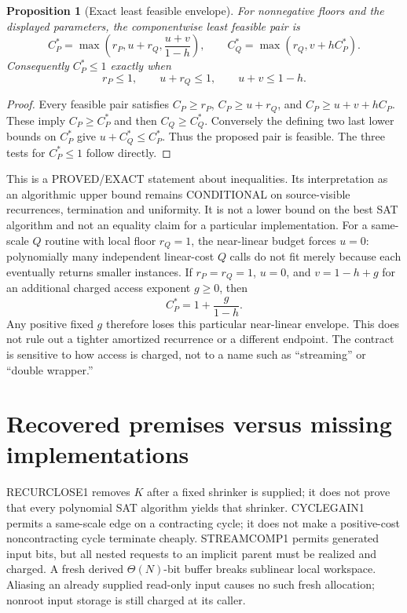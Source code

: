\documentclass[11pt]{article}
\newtheorem{proposition}{Proposition}
\begin{document}
\begin{proposition}[Exact least feasible envelope]
For nonnegative floors and the displayed parameters, the componentwise
least feasible pair is
\[
 C_P^*=\max\left(r_P,u+r_Q,\frac{u+v}{1-h}\right),\qquad
 C_Q^*=\max(r_Q,v+hC_P^*).
\]
Consequently $C_P^*\le1$ exactly when
\[
 \boxed{r_P\le1,\qquad u+r_Q\le1,\qquad u+v\le1-h.}
\]
\end{proposition}
\begin{proof}
Every feasible pair satisfies $C_P\ge r_P$, $C_P\ge u+r_Q$, and
$C_P\ge u+v+hC_P$. These imply $C_P\ge C_P^*$ and then
$C_Q\ge C_Q^*$. Conversely the defining two last lower bounds on
$C_P^*$ give $u+C_Q^*\le C_P^*$. Thus the proposed pair is feasible.
The three tests for $C_P^*\le1$ follow directly.
\end{proof}

This is a PROVED/EXACT statement about inequalities. Its interpretation
as an algorithmic upper bound remains CONDITIONAL on source-visible
recurrences, termination and uniformity. It is not a lower bound on the
best SAT algorithm and not an equality claim for a particular implementation.
For a same-scale $Q$ routine with local floor $r_Q=1$, the near-linear
budget forces $u=0$: polynomially many independent linear-cost $Q$ calls
do not fit merely because each eventually returns smaller instances.
If $r_P=r_Q=1$, $u=0$, and $v=1-h+g$ for an additional charged access
exponent $g\ge0$, then
\[
 C_P^*=1+\frac{g}{1-h}.
\]
Any positive fixed $g$ therefore loses this particular near-linear envelope.
This does not rule out a tighter amortized recurrence or a different endpoint.
The contract is sensitive to how access is charged, not to a name such as
``streaming'' or ``double wrapper.''

\section*{Recovered premises versus missing implementations}
RECURCLOSE1 removes $K$ after a fixed shrinker is supplied; it does not
prove that every polynomial SAT algorithm yields that shrinker.
CYCLEGAIN1 permits a same-scale edge on a contracting cycle; it does not
make a positive-cost noncontracting cycle terminate cheaply. STREAMCOMP1
permits generated input bits, but all nested requests to an implicit parent
must be realized and charged. A fresh derived $\Theta(N)$-bit buffer
breaks sublinear local workspace. Aliasing an already supplied read-only
input causes no such fresh allocation; nonroot input storage is still
charged at its caller.
\end{document}
